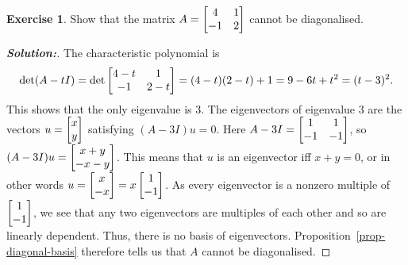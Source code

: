\documentclass[a4paper]{amsart}
\theoremstyle{definition}
\newtheorem{exercise}{Exercise}
\newenvironment{solution}{\begin{proof}[\textbf{Solution:}] \vphantom{u}}{\end{proof}}
\begin{document}
\begin{exercise}\label{ex-diagonal-ii}
 Show that the matrix $A=\left[\begin{matrix} 4 & 1 \\ -1 & 2\end{matrix}\right]$ cannot be
 diagonalised. 
\end{exercise}
\begin{solution}
 The characteristic polynomial is 
 \[ \det(A-tI) = \det\left[\begin{matrix} 4-t & 1 \\ -1 & 2-t \end{matrix}\right] =
     (4-t)(2-t)+1 = 9 - 6t + t^2 = (t-3)^2.
 \]
 This shows that the only eigenvalue is $3$.  The eigenvectors of
 eigenvalue $3$ are the vectors $u=\left[\begin{matrix} x\\y\end{matrix}\right]$ satisfying
 $(A-3I)u=0$.  Here $A-3I=\left[\begin{matrix} 1&1\\-1&-1\end{matrix}\right]$, so
 $(A-3I)u=\left[\begin{matrix} x+y\\-x-y\end{matrix}\right]$.  This means that $u$ is an eigenvector
 iff $x+y=0$, or in other words $u=\left[\begin{matrix} x\\-x\end{matrix}\right]=x\left[\begin{matrix} 1\\-1\end{matrix}\right]$.
 As every eigenvector is a nonzero multiple of $\left[\begin{matrix} 1\\ -1\end{matrix}\right]$, we
 see that any two eigenvectors are multiples of each other and so are
 linearly dependent.  Thus, there is no basis of eigenvectors.
 Proposition~\ref{prop-diagonal-basis} therefore tells us that $A$
 cannot be diagonalised.
\end{solution}
\end{document}
